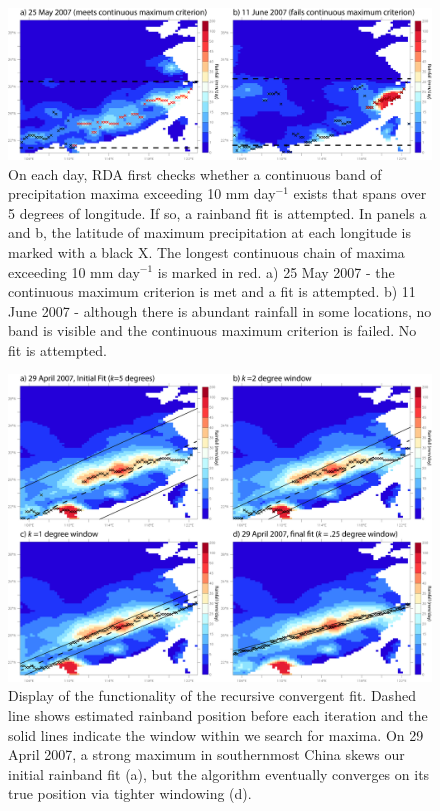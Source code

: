 \documentclass[singlecolumn,11pt]{pnas-new}
\begin{document}
\begin{figure}[htbp]
\centering
\noindent\includegraphics[width=39pc]{Figures/S1}
\caption{On each day, RDA first checks whether a continuous band of precipitation maxima exceeding 10 mm day$^{-1}$ exists that spans over 5 degrees of longitude. If so, a rainband fit is attempted. In panels a and b, the latitude of maximum precipitation at each longitude is marked with a black X. The longest continuous chain of maxima exceeding 10 mm day$^{-1}$ is marked in red. a) 25 May 2007 - the continuous maximum criterion is met and a fit is attempted.  b) 11 June 2007 - although there is abundant rainfall in some locations, no band is visible and the continuous maximum criterion is failed. No fit is attempted.}
\label{fig:algo_1}
\end{figure}

\begin{figure}[htbp]
\centering
\noindent\includegraphics[width=39pc]{Figures/S2}
\caption{Display of the functionality of the recursive convergent fit. Dashed line shows estimated rainband position before each iteration and the solid lines indicate the window within we search for maxima. On 29 April 2007, a strong maximum in southernmost China skews our initial rainband fit (a), but the algorithm eventually converges on its true position via tighter windowing (d).}
\label{fig:algo_2}
\end{figure}
\end{document}
